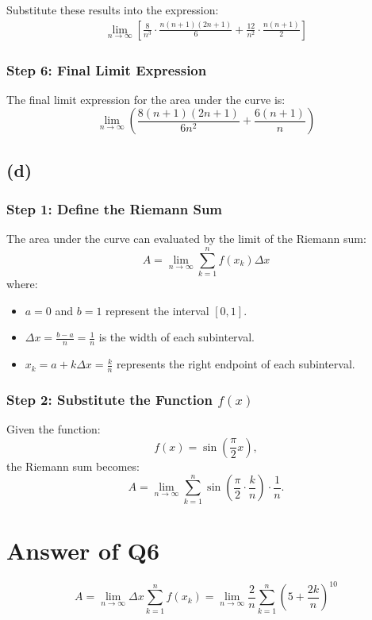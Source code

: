 \documentclass{article}
\begin{document}
Substitute these results into the expression:
\\
\begin{align*}
\lim_{n \to \infty} \left[ \frac{8}{n^3} \cdot \frac{n(n+1)(2n+1)}{6} + \frac{12}{n^2} \cdot \frac{n(n+1)}{2} \right]
\end{align*}

\subsubsection*{Step 6: Final Limit Expression}

The final limit expression for the area under the curve is:
\\
\[
\boxed{\lim_{n \to \infty} \left( \frac{8(n+1)(2n+1)}{6n^2} + \frac{6(n+1)}{n} \right)}
\]
\subsection*{(d)}
\subsubsection*{Step 1: Define the Riemann Sum}
The area under the curve can evaluated by the limit of the Riemann sum:
\[
A = \lim_{n \to \infty} \sum_{k=1}^{n} f(x_k) \Delta x
\]
where:
\begin{itemize}
    \item $a = 0$ and $b = 1$ represent the interval $[0,1]$.
    \item $\Delta x = \frac{b - a}{n} = \frac{1}{n}$ is the width of each subinterval.
    \item $x_k = a + k \Delta x = \frac{k}{n}$ represents the right endpoint of each subinterval.
\end{itemize}

\subsubsection*{Step 2: Substitute the Function $f(x)$}
Given the function:
\[
f(x) = \sin\left(\frac{\pi}{2} x\right),
\]
the Riemann sum becomes:
\[
A = \lim_{n \to \infty}\sum_{k=1}^{n} \sin\left(\frac{\pi}{2} \cdot \frac{k}{n}\right) \cdot \frac{1}{n}.
\]
\section*{Answer of Q6}


\[
A = \lim_{n \to \infty}\Delta x \sum_{k=1}^{n} f(x_k)  =\lim_{n \to \infty} \frac{2}{n} \sum_{k=1}^{n} \left( 5 + \frac{2k}{n} \right)^{10}
\]
\end{document}
